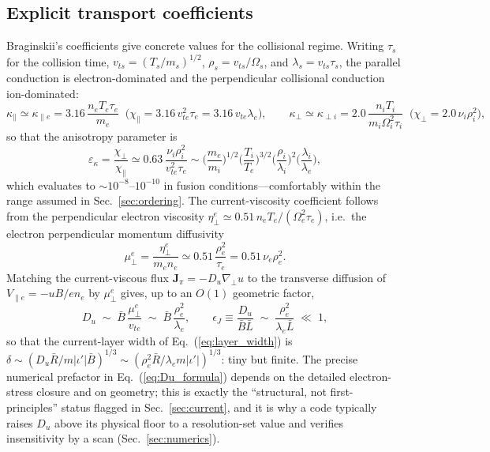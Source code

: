 \documentclass[english]{article}
\newcommand{\bJ}{\mathbf{J}}
\newcommand{\gradperp}{\nabla_{\!\perp}}
\begin{document}
\subsection{Explicit transport coefficients}
\label{sec:coefficients}

Braginskii's coefficients \cite{braginskii1965,helander_sigmar} give concrete values for the
collisional regime. Writing $\tau_s$ for the collision time, $v_{ts}=(T_s/m_s)^{1/2}$,
$\rho_s=v_{ts}/\Omega_s$, and $\lambda_s=v_{ts}\tau_s$, the parallel conduction is
electron-dominated and the perpendicular collisional conduction ion-dominated:
\begin{equation}
\kappa_\parallel\simeq\kappa_{\parallel e}=3.16\,\frac{n_eT_e\tau_e}{m_e}
\;\;\big(\chi_\parallel=3.16\,v_{te}^{2}\tau_e=3.16\,v_{te}\lambda_e\big),
\qquad
\kappa_\perp\simeq\kappa_{\perp i}=2.0\,\frac{n_iT_i}{m_i\Omega_i^{2}\tau_i}
\;\;\big(\chi_\perp=2.0\,\nu_i\rho_i^{2}\big),
\label{eq:brag_kappa}
\end{equation}
so that the anisotropy parameter is
\begin{equation}
\varepsilon_\kappa=\frac{\chi_\perp}{\chi_\parallel}
\simeq0.63\,\frac{\nu_i\rho_i^{2}}{v_{te}^{2}\tau_e}
\sim\Big(\frac{m_e}{m_i}\Big)^{1/2}\Big(\frac{T_i}{T_e}\Big)^{3/2}
\Big(\frac{\rho_i}{\lambda_i}\Big)^{2}\!\!\Big(\frac{\lambda_i}{\lambda_e}\Big),
\label{eq:brag_epsilon}
\end{equation}
which evaluates to $\sim10^{-8}$--$10^{-10}$ in fusion conditions---comfortably within the range
assumed in Sec.~\ref{sec:ordering}. The current-viscosity coefficient follows from the perpendicular
electron viscosity $\eta_{\perp}^{e}\simeq0.51\,n_eT_e/(\Omega_e^{2}\tau_e)$, i.e.\ the electron
perpendicular momentum diffusivity
\begin{equation}
\mu_\perp^{e}=\frac{\eta_\perp^{e}}{m_en_e}\simeq0.51\,\frac{\rho_e^{2}}{\tau_e}
=0.51\,\nu_e\rho_e^{2} .
\label{eq:mu_perp}
\end{equation}
Matching the current-viscous flux $\bJ_\pi=-D_u\gradperp u$ to the transverse diffusion of
$V_{\parallel e}=-uB/en_e$ by $\mu_\perp^{e}$ gives, up to an $O(1)$ geometric factor,
\begin{equation}
D_u\;\sim\;\bar B\,\frac{\mu_\perp^{e}}{v_{te}}\;\sim\;\bar B\,\frac{\rho_e^{2}}{\lambda_e} ,
\qquad
\epsilon_J\equiv\frac{D_u}{\bar B\bar L}\;\sim\;\frac{\rho_e^{2}}{\lambda_e\bar L}\;\ll\;1 ,
\label{eq:Du_formula}
\end{equation}
so that the current-layer width of Eq.~(\ref{eq:layer_width}) is
$\delta\sim(D_u\bar R/m|\iota'|\bar B)^{1/3}\sim(\rho_e^{2}\bar R/\lambda_e m|\iota'|)^{1/3}$: tiny
but finite. The precise numerical prefactor in Eq.~(\ref{eq:Du_formula}) depends on the detailed
electron-stress closure and on geometry; this is exactly the ``structural, not first-principles''
status flagged in Sec.~\ref{sec:current}, and it is why a code typically raises $D_u$ above its
physical floor to a resolution-set value and verifies insensitivity by a scan
(Sec.~\ref{sec:numerics}).
\end{document}
